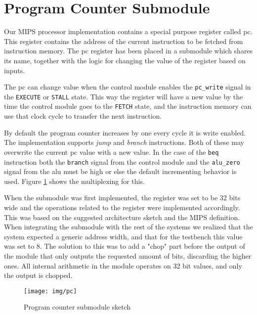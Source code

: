 \section{Program Counter Submodule}
Our MIPS processor implementation contains a special purpose register called \gls{pc}.
This register contains the address of the current instruction to be fetched from instruction memory.
The \gls{pc} register has been placed in a submodule which shares its name,
together with the logic for changing the value of the register based on inputs.

The \gls{pc} can change value when the control module enables the \texttt{pc\_write} signal in the \texttt{EXECUTE} or \texttt{STALL} state.
This way the register will have a new value by the time the control module goes to the \texttt{FETCH} state,
and the instruction memory can use that clock cycle to transfer the next instruction.

By default the program counter increases by one every cycle it is write enabled.
The implementation supports \textit{jump} and \textit{branch} instructions.
Both of these may overwrite the current \gls{pc} value with a new value.
In the case of the \texttt{beq} instruction both the \texttt{branch} signal from the control module and the \texttt{alu\_zero} signal from the \gls{alu} must be high or else the default incrementing behavior is used.
Figure \ref{fig:pc} shows the multiplexing for this.

When the submodule was first implemented,
the register was set to be 32 bits wide and the operations related to the register were implemented accordingly.
This was based on the suggested architecture sketch and the MIPS definition.
When integrating the submodule with the rest of the systems we realized that the system expected a generic address width, and that for the testbench this value was set to 8.
The solution to this was to add a "chop" part before the output of the module that only outputs the requested amount of bits, discarding the higher ones.
All internal arithmetic in the module operates on 32 bit values,
and only the output is chopped.

\begin{figure}[h]
    \centering
    \texttt{[image: img/pc]}
    \caption{Program counter submodule sketch}
    \label{fig:pc}
\end{figure}

